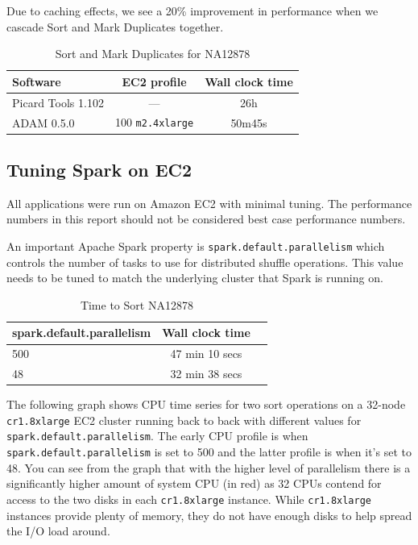 \documentclass[10pt,twocolumn]{article}
\theoremstyle{plain}
\begin{document}
Due to caching effects, we see a 20\% improvement in performance when we cascade Sort and Mark Duplicates together.

\begin{table}[h]
\caption{Sort and Mark Duplicates for NA12878}
\label{tab:time-mark-duplicates-sort}
\begin{scriptsize}
\begin{center}
\begin{tabular}{| l | c | c |}
\hline
\bf Software & \bf EC2 profile & \bf Wall clock time \\
\hline
Picard Tools 1.102 & --- & 26h \\
ADAM 0.5.0 & 100 \texttt{m2.4xlarge} & 50m45s \\
\hline
\end{tabular}
\end{center}
\end{scriptsize}
\end{table}

\subsection{Tuning Spark on EC2}

All applications were run on Amazon EC2 with minimal tuning. The performance numbers in this report
should not be considered best case performance numbers.

An important Apache Spark property is \texttt{spark.default.parallelism} which controls the number
of tasks to use for distributed shuffle operations. This value needs to be tuned to match the
underlying cluster that Spark is running on.

\begin{table}[h]
\caption{Time to Sort NA12878}
\label{tab:time-sort-parallelism}
\begin{center}
\begin{tabular}{| l | c | c |}
\hline
\bf \small{spark.default.parallelism} & \bf Wall clock time \\
\hline
500 & 47 min 10 secs \\
48 & 32 min 38 secs \\ 
\hline
\end{tabular}
\end{center}
\end{table}

The following graph shows CPU time series for two sort operations on a 32-node \texttt{cr1.8xlarge}
EC2 cluster running back to back with different values for \texttt{spark.default.parallelism}.
The early CPU profile is when \texttt{spark.default.parallelism} is set to 500 and the latter profile
is when it's set to 48. You can see from the graph that with the higher level of parallelism
there is a significantly higher amount of system CPU (in red) as 32 CPUs contend for access to 
the two disks in each \texttt{cr1.8xlarge} instance. While \texttt{cr1.8xlarge} instances provide
plenty of memory, they do not have enough disks to help spread the I/O load around.
\end{document}
